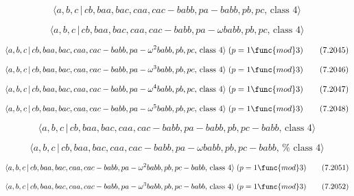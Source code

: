 \documentclass[10pt]{article}
\begin{document}
\begin{equation}
\langle a,b,c\,|\,cb,baa,bac,caa,cac-babb,pa-babb,pb,pc,\,\text{class }%
4\rangle  \tag{7.2043}
\end{equation}

\begin{equation}
\langle a,b,c\,|\,cb,baa,bac,caa,cac-babb,pa-\omega babb,pb,pc,\,\text{class 
}4\rangle  \tag{7.2044}
\end{equation}

\begin{equation}
\langle a,b,c\,|\,cb,baa,bac,caa,cac-babb,pa-\omega ^{2}babb,pb,pc,\,\text{%
class }4\rangle \;(p=1\func{mod}3)  \tag{7.2045}
\end{equation}

\begin{equation}
\langle a,b,c\,|\,cb,baa,bac,caa,cac-babb,pa-\omega ^{3}babb,pb,pc,\,\text{%
class }4\rangle \;(p=1\func{mod}3)  \tag{7.2046}
\end{equation}

\begin{equation}
\langle a,b,c\,|\,cb,baa,bac,caa,cac-babb,pa-\omega ^{4}babb,pb,pc,\,\text{%
class }4\rangle \;(p=1\func{mod}3)  \tag{7.2047}
\end{equation}

\begin{equation}
\langle a,b,c\,|\,cb,baa,bac,caa,cac-babb,pa-\omega ^{5}babb,pb,pc,\,\text{%
class }4\rangle \;(p=1\func{mod}3)  \tag{7.2048}
\end{equation}

\begin{equation}
\langle a,b,c\,|\,cb,baa,bac,caa,cac-babb,pa-babb,pb,pc-babb,\,\text{class }%
4\rangle  \tag{7.2049}
\end{equation}

\begin{equation}
\langle a,b,c\,|\,cb,baa,bac,caa,cac-babb,pa-\omega babb,pb,pc-babb,\,\text{%
class }4\rangle  \tag{7.2050}
\end{equation}

\begin{equation}
\langle a,b,c\,|\,cb,baa,bac,caa,cac-babb,pa-\omega ^{2}babb,pb,pc-babb,\,%
\text{class }4\rangle \;(p=1\func{mod}3)  \tag{7.2051}
\end{equation}

\begin{equation}
\langle a,b,c\,|\,cb,baa,bac,caa,cac-babb,pa-\omega ^{3}babb,pb,pc-babb,\,%
\text{class }4\rangle \;(p=1\func{mod}3)  \tag{7.2052}
\end{equation}
\end{document}
